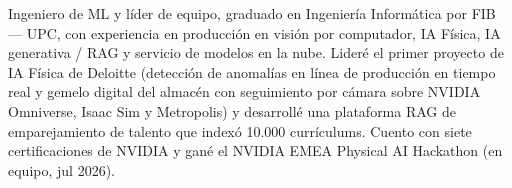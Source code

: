 
\begin{cvparagraph}
    Ingeniero de ML y líder de equipo, graduado en Ingeniería Informática por FIB --- UPC, con experiencia en producción en visión por computador, IA Física, IA generativa / RAG y servicio de modelos en la nube. Lideré el primer proyecto de IA Física de Deloitte (detección de anomalías en línea de producción en tiempo real y gemelo digital del almacén con seguimiento por cámara sobre NVIDIA Omniverse, Isaac Sim y Metropolis) y desarrollé una plataforma RAG de emparejamiento de talento que indexó 10.000 currículums. Cuento con siete certificaciones de NVIDIA y gané el NVIDIA EMEA Physical AI Hackathon (en equipo, jul 2026).
\end{cvparagraph}
